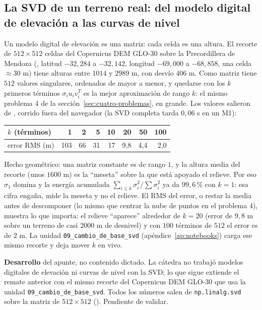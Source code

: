 \subsection{La SVD de un terreno real: del modelo digital de elevación a las curvas de nivel}\label{sec:svd-dem}
Un modelo digital de elevación es una
matriz: cada celda es una altura. El recorte de \(512\times512\) celdas del Copernicus DEM
GLO-30 sobre la Precordillera de Mendoza (, latitud
\(-32{,}284\) a \(-32{,}142\), longitud \(-69{,}000\) a \(-68{,}858\), una celda
\(\approx30\) m) tiene alturas entre \(1014\) y \(2989\) m, con desvío \(406\) m. Como
matriz tiene \(512\) valores singulares, ordenados de mayor a menor, y quedarse con los
\(k\) primeros términos \(\sigma_iu_iv_i^T\) es la mejor aproximación de rango \(k\): el
mismo problema 4 de la sección~\ref{sec:cuatro-problemas}, en grande. Los valores salieron
de , corrido fuera del navegador (la SVD completa tarda
\(0{,}06\) s en un M1):

{\small
\begin{center}
\begin{tabular}{l rrrrrrr}
\toprule
\(k\) (términos) & 1 & 2 & 5 & 10 & 20 & 50 & 100\\
\midrule
error RMS (m) & 103 & 66 & 31 & 17 & 9{,}8 & 4{,}4 & 2{,}0\\
\bottomrule
\end{tabular}
\end{center}
}

Hecho geométrico: una matriz constante es de rango \(1\), y la altura media del recorte
(unos \(1600\) m) es la ``meseta'' sobre la que está apoyado el relieve. Por eso
\(\sigma_1\) domina y la energía acumulada \(\sum_{i\le k}\sigma_i^2/\sum\sigma_i^2\) ya
da \(99{,}6\)\,\% con \(k=1\): esa cifra engaña, mide la meseta y no el relieve. El RMS
del error, o restar la media antes de descomponer (lo mismo que centrar la nube de puntos
en el problema 4), muestra lo que importa: el relieve ``aparece'' alrededor de \(k=20\)
(error de \(9{,}8\) m sobre un terreno de casi \(2000\) m de desnivel) y con \(100\)
términos de \(512\) el error es de \(2\) m. La unidad \texttt{09\_cambio\_de\_base\_svd}
(apéndice~\ref{ap:notebooks}) carga ese mismo recorte y deja mover \(k\) en vivo.


\begin{atencion}[Anticipado]
\textbf{Desarrollo} del apunte, no contenido dictado. La cátedra no trabajó modelos digitales
de elevación ni curvas de nivel con la SVD; lo que sigue extiende el remate anterior con el
mismo recorte del Copernicus DEM GLO-30 que usa la unidad \texttt{09\_cambio\_de\_base\_svd}.
Todos los números salen de \texttt{np.linalg.svd} sobre la matriz de \(512\times512\)
(). Pendiente de validar.
\end{atencion}

